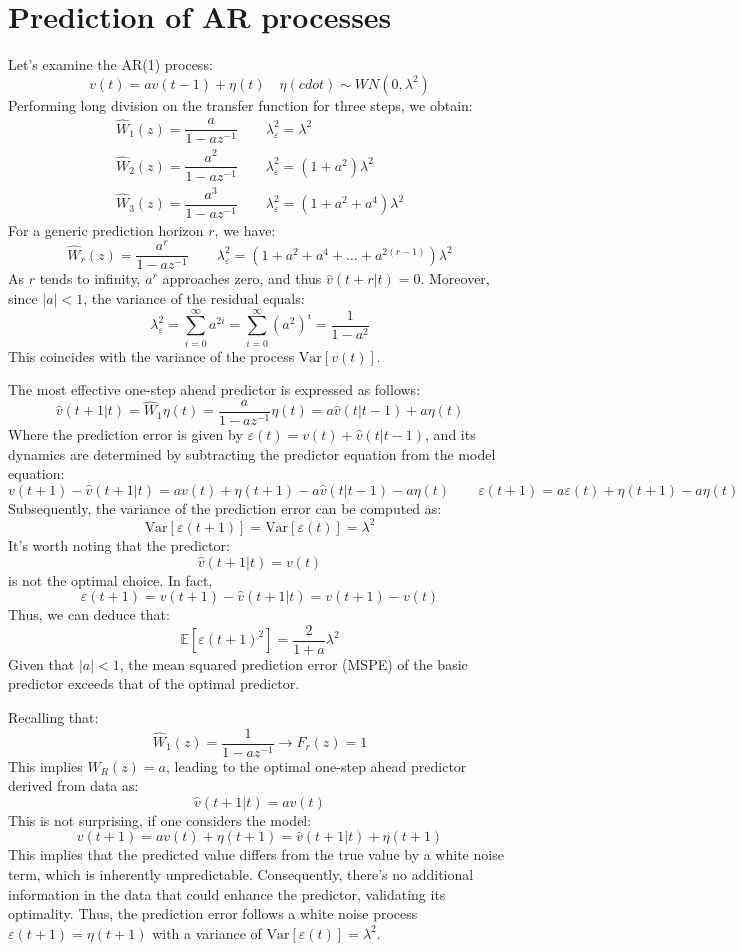\section{Prediction of AR processes}

Let's examine the AR(1) process:
\[v(t)=av(t-1)+\eta(t)\quad \eta(cdot)\sim WN(0,\lambda^2)\]
Performing long division on the transfer function for three steps, we obtain:
\begin{align*}
    \hat{W}_1(z)=\dfrac{a}{1-az^{-1}} \qquad \lambda_\varepsilon^2=\lambda^2 \\
    \hat{W}_2(z)=\dfrac{a^2}{1-az^{-1}} \qquad \lambda_\varepsilon^2=(1+a^2)\lambda^2 \\ 
    \hat{W}_3(z)=\dfrac{a^3}{1-az^{-1}} \qquad \lambda_\varepsilon^2=(1+a^2+a^4)\lambda^2
\end{align*}
For a generic prediction horizon $r$, we have:
\[\hat{W}_r(z)=\dfrac{a^r}{1-az^{-1}} \qquad \lambda_\varepsilon^2=(1+a^2+a^4+\dots+a^{2(r-1)})\lambda^2\]
As $r$ tends to infinity, $a^r$ approaches zero, and thus $\hat{v}(t+r|t)=0$. 
Moreover, since $\left\lvert a\right\rvert < 1$, the variance of the residual equals:
\[\lambda_{\varepsilon}^2=\sum_{i=0}^\infty a^{2i}=\sum_{i=0}^\infty (a^2)^{i}=\dfrac{1}{1-a^2}\]
This coincides with the variance of the process $\text{Var}\left[v(t)\right]$.

The most effective one-step ahead predictor is expressed as follows:
\[\hat{v}(t+1|t)=\hat{W}_1\eta(t)=\dfrac{a}{1-az^{-1}}\eta(t)=a\hat{v}(t|t-1)+a\eta(t)\]
Where the prediction error is given by $\varepsilon(t) = v(t) +\hat{v}(t|t-1)$, and its dynamics are determined by subtracting the predictor equation from the model equation:
\[v(t+1)- \hat{v}(t+1|t) = av(t) + \eta(t+1) - a\hat{v}(t|t-1) - a\eta(t) \qquad \varepsilon(t+1) = a\varepsilon(t) + \eta(t+1) - a\eta(t) \]
Subsequently, the variance of the prediction error can be computed as:
\[\text{Var}\left[\varepsilon(t+1)\right]=\text{Var}\left[\varepsilon(t)\right]=\lambda^2\]
It's worth noting that the predictor:
\[\hat{v}(t+1|t)=v(t)\]
is not the optimal choice. 
In fact,
\[\varepsilon(t+1)=v(t+1)-\hat{v}(t+1|t)=v(t+1)-v(t)\]
Thus, we can deduce that:
\[\mathbb{E}\left[ \varepsilon(t+1)^2 \right]=\dfrac{2}{1+a}\lambda^2\]
Given that $\left\lvert a\right\rvert < 1$, the mean squared prediction error (MSPE) of the basic predictor exceeds that of the optimal predictor.

Recalling that: 
\[\hat{W}_1(z)=\dfrac{1}{1-az^{-1}} \rightarrow F_r(z)=1\]
This implies $W_R(z)=a$, leading to the optimal one-step ahead predictor derived from data as:
\[\hat{v}(t+1|t)=av(t)\]
This is not surprising, if one considers the model: 
\[v(t+1) = av(t) + \eta(t+1) = \hat{v}(t+1|t) + \eta(t+1) \]
This implies that the predicted value differs from the true value by a white noise term, which is inherently unpredictable.
Consequently, there's no additional information in the data that could enhance the predictor, validating its optimality.
Thus, the prediction error follows a white noise process $\varepsilon(t+1)=\eta(t+1)$ with a variance of $\text{Var}\left[\varepsilon(t)\right]=\lambda^2$.